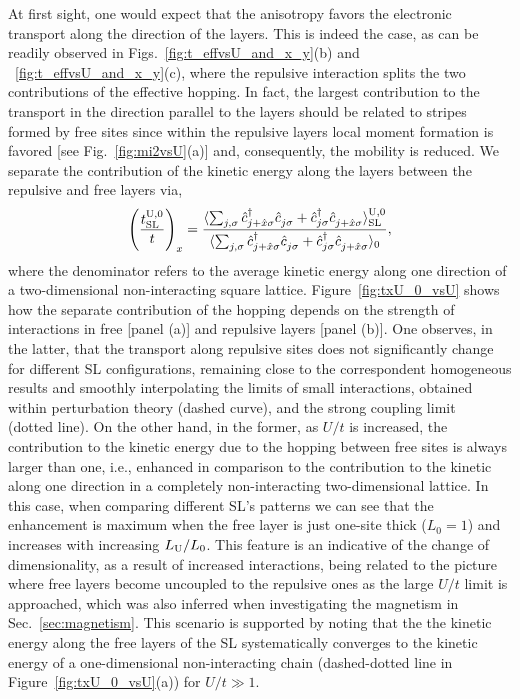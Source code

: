 \documentclass[aps,pra,reprint,twocolumn,showpacs,longbibliography,superscriptaddress]{revtex4-1}
\begin{document}
At first sight, one would expect that the anisotropy favors the electronic transport along the direction of the layers. This is indeed the case, as can be readily observed in Figs.~\ref{fig:t_effvsU_and_x_y}(b) and ~\ref{fig:t_effvsU_and_x_y}(c), where the repulsive interaction splits the two contributions of the effective hopping. In fact, the largest contribution to the transport in the direction parallel to the layers should be related to stripes formed by free sites since  within  the repulsive layers  local moment formation is favored [see Fig.~\ref{fig:mi2vsU}(a)] and, consequently, the  mobility is reduced. We separate the contribution of the kinetic energy along the layers between  the repulsive and free layers via,
\begin{equation}
\left(\frac {t^{\rm U,0}_{{\rm SL}}} {t}\right)_x=\frac {   \langle  \sum_{j,\sigma} \hat c^\dagger_{j+\hat{x}\sigma} \hat c_{j \sigma}^{\phantom\dagger}+ \hat c^\dagger_{j\sigma} \hat c_{j +\hat{x}\sigma}^{\phantom\dagger}  \rangle^{\rm U,0}_{\rm SL}}  {\langle  \sum_{j,\sigma}  \hat c^\dagger_{j+\hat{x}\sigma} \hat c_{j \sigma}^{\phantom\dagger}+ \hat c^\dagger_{j\sigma} \hat c_{j +\hat{x}\sigma}^{\phantom\dagger}  \rangle_0},
\end{equation}
where the denominator refers to the average kinetic energy along one direction of a two-dimensional non-interacting square lattice.
Figure~\ref{fig:txU_0_vsU} shows how the separate contribution of the hopping depends on the strength of interactions in free [panel (a)] and repulsive layers [panel (b)]. One observes, in the latter, that the transport along repulsive sites does not significantly change for different SL configurations, remaining close to the correspondent homogeneous results and smoothly interpolating the limits of small interactions, obtained within perturbation theory (dashed curve), and the strong coupling limit~\cite{White89b} (dotted line). On the other hand,  in the former, as $U/t$ is increased, the contribution to the kinetic energy due to the hopping between free sites is always larger than one, i.e., enhanced in comparison to the contribution to the kinetic along one direction in a completely non-interacting two-dimensional lattice. In this case, when comparing  different SL's patterns we can see that the enhancement is maximum when the free layer is  just one-site thick ($L_0=1$) and increases with increasing $L_{\rm U}/L_0$. This feature is an indicative of the change of dimensionality, as a result of increased interactions, being related to the picture where free layers become uncoupled to the repulsive ones as the large $U/t$ limit is approached, which was also inferred when investigating the magnetism in Sec.~\ref{sec:magnetism}. This scenario is supported by noting that the  
the kinetic energy along the free layers of the SL systematically converges to the kinetic energy of a one-dimensional non-interacting chain (dashed-dotted line in Figure~\ref{fig:txU_0_vsU}(a)) for $U/t\gg1$. 
\end{document}

